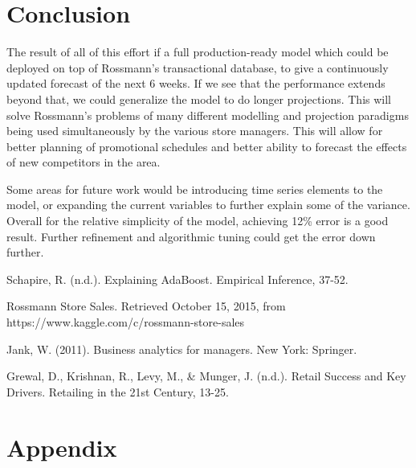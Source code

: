 \documentclass[DIV=calc, paper=a4, fontsize=11pt]{scrartcl}	 %
\begin{document}

\section*{Conclusion}

The result of all of this effort if a full production-ready model which could be deployed on top of Rossmann's transactional database, to give a continuously updated forecast of the next 6 weeks. If we see that the performance extends beyond that, we could generalize the model to do longer projections. This will solve Rossmann's problems of many different modelling and projection paradigms being used simultaneously by the various store managers. This will allow for better planning of promotional schedules and better ability to forecast the effects of new competitors in the area.

Some areas for future work would be introducing time series elements to the model, or expanding the current variables to further explain some of the variance. Overall for the relative simplicity of the model, achieving 12\% error is a good result. Further refinement and algorithmic tuning could get the error down further.




\begin{thebibliography}{99} %

Schapire, R. (n.d.). Explaining AdaBoost. Empirical Inference, 37-52. 


Rossmann Store Sales. Retrieved October 15, 2015, from https://www.kaggle.com/c/rossmann-store-sales


Jank, W. (2011). Business analytics for managers. New York: Springer. 


Grewal, D., Krishnan, R., Levy, M., \& Munger, J. (n.d.). Retail Success and Key 
Drivers. Retailing in the 21st Century, 13-25.

\end{thebibliography}


\newpage

\section*{Appendix}
\end{document}
